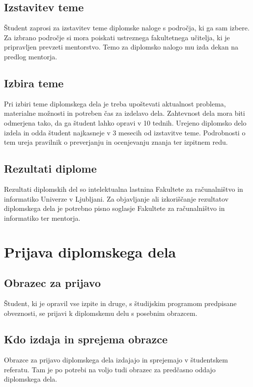 \documentclass[12pt,a4paper,openany]{book}
\begin{document}
\section{Izstavitev teme} 
Študent  zaprosi za izstavitev teme diplomske naloge s področja, ki ga sam izbere. Za  izbrano področje si mora poiskati ustreznega
fakultetnega učitelja, ki je pripravljen prevzeti mentorstvo. Temo za diplomsko nalogo mu izda dekan na predlog mentorja. 

\section{Izbira teme}
Pri izbiri teme diplomskega dela je treba upoštevati aktualnost problema, materialne možnosti in potreben čas za izdelavo dela.
Zahtevnost dela mora biti odmerjena tako, da ga študent lahko opravi v 10 tednih. Urejeno diplomsko delo izdela in odda študent najkasneje v 3
mesecih od izstavitve teme. Podro\-bnosti o tem ureja pravilnik o preverjanju in ocenjevanju znanja ter izpitnem redu.

\section{Rezultati diplome}
Rezultati diplomskih del so intelektualna lastnina Fakultete za ra\-ču\-nal\-niš\-tvo in informatiko Univerze v Ljubljani. Za
objavljanje ali izkoriščanje rezultatov diplomskega dela je potrebno pisno soglasje Fakultete za ra\-ču\-nal\-niš\-tvo in informatiko ter
mentorja.



\chapter{Prijava diplomskega dela}

\section{Obrazec za prijavo} 
Študent, ki je opravil vse izpite in druge, s študijskim programom predpisane obveznosti, se prijavi k diplomskemu delu s posebnim
obrazcem. 

\section{Kdo izdaja in sprejema obrazce} 
Obrazce za prijavo diplomskega dela izdajajo in sprejemajo v študentskem referatu. 
Tam je po potrebi na voljo tudi obrazec za predčasno oddajo diplom\-skega dela.
\end{document}
